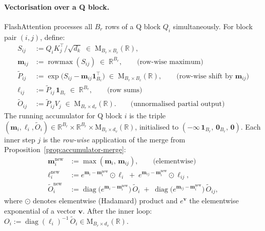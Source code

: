 \documentclass[11pt]{amsart}
\theoremstyle{plain}
\theoremstyle{definition}
\newcommand{\R}{\mathbb{R}}
\newcommand{\Mat}[2]{\mathrm{M}_{#1 \times #2}(\R)}
\newcommand{\diag}{\operatorname{diag}}
\DeclareMathOperator{\rowmax}{rowmax}
\begin{document}
\paragraph{Vectorisation over a Q block.}
FlashAttention processes all $B_r$ rows of a Q block $Q_i$ simultaneously.
For block pair $(i,j)$, define:
\begin{align*}
    S_{ij} &:= Q_i K_j^\top / \sqrt{d_k} \;\in\; \Mat{B_r}{B_c}, \\
    \mathbf{m}_{ij} &:= \rowmax(S_{ij}) \;\in\; \R^{B_r},
    \qquad\text{(row-wise maximum)} \\
    \tilde{P}_{ij} &:= \exp\!\bigl(S_{ij} - \mathbf{m}_{ij}\mathbf{1}_{B_c}^\top\bigr)
    \;\in\; \Mat{B_r}{B_c},
    \qquad\text{(row-wise shift by } \mathbf{m}_{ij}\text{)} \\
    \boldsymbol{\ell}_{ij} &:= \tilde{P}_{ij}\,\mathbf{1}_{B_c} \;\in\; \R^{B_r},
    \qquad\text{(row sums)} \\
    \tilde{O}_{ij} &:= \tilde{P}_{ij} V_j \;\in\; \Mat{B_r}{d_v}.
    \qquad\text{(unnormalised partial output)}
\end{align*}
The running accumulator for Q block $i$ is the triple
$(\mathbf{m}_i, \boldsymbol{\ell}_i, \tilde{O}_i)
\in \R^{B_r} \times \R^{B_r} \times \Mat{B_r}{d_v}$,
initialised to $(-\infty\,\mathbf{1}_{B_r},\, \mathbf{0}_{B_r},\, \mathbf{0})$.
Each inner step $j$ is the \emph{row-wise} application of the merge from
Proposition~\ref{prop:accumulator-merge}:
\begin{align*}
    \mathbf{m}_i^{\mathrm{new}} &:= \max(\mathbf{m}_i,\, \mathbf{m}_{ij}),
    \qquad\text{(elementwise)} \\
    \boldsymbol{\ell}_i^{\mathrm{new}} &:=
        e^{\mathbf{m}_i - \mathbf{m}_i^{\mathrm{new}}} \odot \boldsymbol{\ell}_i
        \;+\; e^{\mathbf{m}_{ij} - \mathbf{m}_i^{\mathrm{new}}} \odot \boldsymbol{\ell}_{ij}, \\
    \tilde{O}_i^{\mathrm{new}} &:=
        \diag\!\bigl(e^{\mathbf{m}_i - \mathbf{m}_i^{\mathrm{new}}}\bigr)\,\tilde{O}_i
        \;+\; \diag\!\bigl(e^{\mathbf{m}_{ij} - \mathbf{m}_i^{\mathrm{new}}}\bigr)\,\tilde{O}_{ij},
\end{align*}
where $\odot$ denotes elementwise (Hadamard) product and
$e^{\mathbf{v}}$ the elementwise exponential of a vector $\mathbf{v}$.
After the inner loop: $O_i := \diag(\boldsymbol{\ell}_i)^{-1}\,\tilde{O}_i \in \Mat{B_r}{d_v}$.
\end{document}
